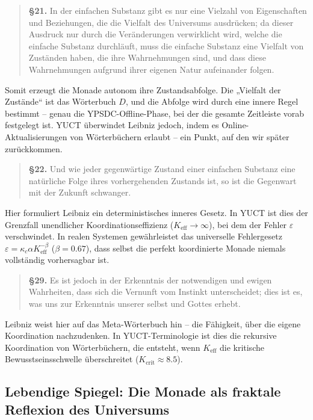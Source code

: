 \documentclass[12pt,a4paper]{article}
\begin{document}
	\begin{quote}
		\textbf{§21.} In der einfachen Substanz gibt es nur eine Vielzahl von Eigenschaften und Beziehungen, die die Vielfalt des Universums ausdrücken; da dieser Ausdruck nur durch die Veränderungen verwirklicht wird, welche die einfache Substanz durchläuft, muss die einfache Substanz eine Vielfalt von Zuständen haben, die ihre Wahrnehmungen sind, und dass diese Wahrnehmungen aufgrund ihrer eigenen Natur aufeinander folgen.
	\end{quote}
	
	Somit erzeugt die Monade autonom ihre Zustandsabfolge. Die „Vielfalt der Zustände“ ist das Wörterbuch \(D\), und die Abfolge wird durch eine innere Regel bestimmt – genau die YPSDC-Offline-Phase, bei der die gesamte Zeitleiste vorab festgelegt ist. YUCT überwindet Leibniz jedoch, indem es Online-Aktualisierungen von Wörterbüchern erlaubt – ein Punkt, auf den wir später zurückkommen.
	
	\begin{quote}
		\textbf{§22.} Und wie jeder gegenwärtige Zustand einer einfachen Substanz eine natürliche Folge ihres vorhergehenden Zustands ist, so ist die Gegenwart mit der Zukunft schwanger.
	\end{quote}
	
	Hier formuliert Leibniz ein deterministisches inneres Gesetz. In YUCT ist dies der Grenzfall unendlicher Koordinationseffizienz (\(K_{\mathrm{eff}} \to \infty\)), bei dem der Fehler \(\varepsilon\) verschwindet. In realen Systemen gewährleistet das universelle Fehlergesetz \(\varepsilon = \kappa_c \alpha K_{\mathrm{eff}}^{-\beta}\) (\(\beta=0.67\)), dass selbst die perfekt koordinierte Monade niemals vollständig vorhersagbar ist.
	
	\begin{quote}
		\textbf{§29.} Es ist jedoch in der Erkenntnis der notwendigen und ewigen Wahrheiten, dass sich die Vernunft vom Instinkt unterscheidet; dies ist es, was uns zur Erkenntnis unserer selbst und Gottes erhebt.
	\end{quote}
	
	Leibniz weist hier auf das Meta-Wörterbuch hin – die Fähigkeit, über die eigene Koordination nachzudenken. In YUCT-Terminologie ist dies die rekursive Koordination von Wörterbüchern, die entsteht, wenn \(K_{\mathrm{eff}}\) die kritische Bewusstseinsschwelle überschreitet (\(K_{\mathrm{crit}} \approx 8.5\)).
	
	\subsection{Lebendige Spiegel: Die Monade als fraktale Reflexion des Universums}
	
\end{document}
